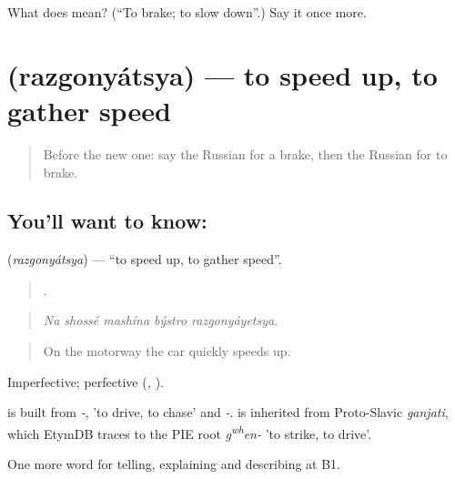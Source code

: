 \begin{tcolorbox}[breakable,colback=teal!4,colframe=teal!35!black,title={Before you move on}]
What does  mean? (\textquotedblleft{}To brake; to slow down\textquotedblright{}.) Say it once more.
\end{tcolorbox}
\section[\texorpdfstring{\ru{разгоняться} (razgonyátsya)}{разгоняться (razgonyátsya)}]{ (razgonyátsya) — to speed up, to gather speed}

\label{lesson:RU-C403-razgonyatsya}



\begin{quote}
Before the new one: say the Russian for a brake, then the Russian for to brake.
\end{quote}

\subsection*{You'll want to know: }
\textbf{} (\emph{razgonyátsya}) — \textquotedblleft{}to speed up, to gather speed\textquotedblright{}.

\begin{quote}
    .
\end{quote}

\begin{quote}
\emph{Na shossé mashína býstro razgonyáyetsya.}
\end{quote}

\begin{quote}
On the motorway the car quickly speeds up.
\end{quote}

Imperfective; perfective \emph{} (\emph{, }).

\begin{cousinweb}
\emph{} is built from \emph{-}, \emph{} 'to drive, to chase' and \emph{-}. \emph{} is inherited from Proto-Slavic \emph{ganjati}, which EtymDB traces to the PIE root \emph{g\textsuperscript{w}\textsuperscript{h}en-} 'to strike, to drive'.
\end{cousinweb}

\begin{grammarlens}[title={What you've built}]
One more word for telling, explaining and describing at B1.
\end{grammarlens}

